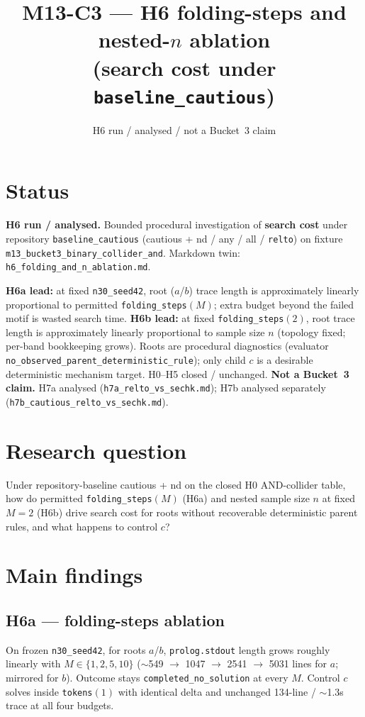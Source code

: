 \documentclass[11pt]{article}
\title{M13-C3 --- H6 folding-steps and nested-$n$ ablation\\
(search cost under \texttt{baseline\_cautious})}
\author{}
\date{H6 run / analysed / not a Bucket~3 claim}
\begin{document}
\maketitle

\section{Status}

\textbf{H6 run / analysed.}
Bounded procedural investigation of \textbf{search cost} under repository
\texttt{baseline\_cautious} (cautious + nd / any / all / \texttt{relto}) on
fixture \texttt{m13\_bucket3\_binary\_collider\_and}.
Markdown twin: \texttt{h6\_folding\_and\_n\_ablation.md}.

\textbf{H6a lead:} at fixed \texttt{n30\_seed42}, root ($a$/$b$) trace length is
approximately linearly proportional to permitted \texttt{folding\_steps}$(M)$;
extra budget beyond the failed motif is wasted search time.
\textbf{H6b lead:} at fixed \texttt{folding\_steps}$(2)$, root trace length is
approximately linearly proportional to sample size $n$ (topology fixed;
per-band bookkeeping grows).
Roots are procedural diagnostics (evaluator
\texttt{no\_observed\_parent\_deterministic\_rule}); only child $c$ is a
desirable deterministic mechanism target.
H0--H5 closed / unchanged.
\textbf{Not a Bucket~3 claim.}
H7a analysed (\texttt{h7a\_relto\_vs\_sechk.md}); H7b analysed separately
(\texttt{h7b\_cautious\_relto\_vs\_sechk.md}).

\section{Research question}

Under repository-baseline cautious + nd on the closed H0 AND-collider table,
how do permitted \texttt{folding\_steps}$(M)$ (H6a) and nested sample size $n$
at fixed $M{=}2$ (H6b) drive search cost for roots without recoverable
deterministic parent rules, and what happens to control $c$?

\section{Main findings}

\subsection{H6a --- folding-steps ablation}

On frozen \texttt{n30\_seed42}, for roots $a$/$b$, \texttt{prolog.stdout} length
grows roughly linearly with $M\in\{1,2,5,10\}$
($\sim$549 $\to$ 1047 $\to$ 2541 $\to$ 5031 lines for $a$; mirrored for $b$).
Outcome stays \texttt{completed\_no\_solution} at every $M$.
Control $c$ solves inside \texttt{tokens}$(1)$ with identical delta and
unchanged 134-line / $\sim$1.3s trace at all four budgets.
\end{document}
